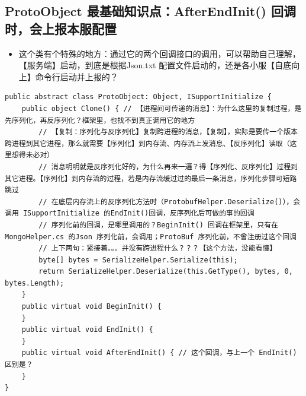 \documentclass[9pt, b5paper]{article}
\begin{document}
\subsection{ProtoObject 最基础知识点：AfterEndInit() 回调时，会上报本服配置}
\label{sec-7-2}
\begin{itemize}
\item 这个类有个特殊的地方：通过它的两个回调接口的调用，可以帮助自己理解，【服务端】启动，到底是根据Json.txt 配置文件启动的，还是各小服【自底向上】命令行启动并上报的？
\end{itemize}
\begin{verbatim}
public abstract class ProtoObject: Object, ISupportInitialize {
    public object Clone() { // 【进程间可传递的消息】：为什么这里的复制过程，是先序列化，再反序列化？框架里，也找不到真正调用它的地方
        // 【复制：序列化与反序列化】复制跨进程的消息，【复制】，实际是要传一个版本跨进程到其它进程，那么就需要【序列化】到内存流、内存流上发消息、【反序列化】读取（这里想得未必对）
        // 消息明明就是反序列化好的，为什么再来一遍？得【序列化、反序列化】过程到其它进程。【序列化】到内存流的过程，若是内存流缓过过的最后一条消息，序列化步骤可短路跳过
        // 在底层内存流上的反序列化方法时（ProtobufHelper.Deserialize()），会调用 ISupportInitialize 的EndInit()回调，反序列化后可做的事的回调
        // 序列化前的回调，是哪里调用的？BeginInit() 回调在框架里，只有在MongoHelper.cs 的Json 序列化前，会调用；ProtoBuf 序列化前，不曾注册过这个回调
        // 上下两句：紧接着。。。并没有跨进程什么？？？【这个方法，没能看懂】 
        byte[] bytes = SerializeHelper.Serialize(this);
        return SerializeHelper.Deserialize(this.GetType(), bytes, 0, bytes.Length);
    }
    public virtual void BeginInit() {
    }
    public virtual void EndInit() {
    }
    public virtual void AfterEndInit() { // 这个回调，与上一个 EndInit() 区别是？
    }
}
\end{verbatim}
\end{document}
